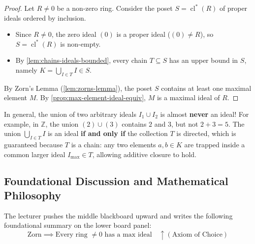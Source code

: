 \begin{content}
\begin{proof}
Let $R \neq 0$ be a non-zero ring. Consider the poset $S = \operatorname{cl}^*(R)$ of proper ideals ordered by inclusion.
\begin{itemize}
    \item Since $R \neq 0$, the zero ideal $(0)$ is a proper ideal ($(0) \neq R$), so $S = \operatorname{cl}^*(R)$ is non-empty.
    \item By \cref{lem:chains-ideals-bounded}, every chain $T \subseteq S$ has an upper bound in $S$, namely $K = \bigcup_{I \in T} I \in S$.
\end{itemize}
By Zorn's Lemma (\cref{lem:zorns-lemma}), the poset $S$ contains at least one maximal element $M$. By \cref{prop:max-element-ideal-equiv}, $M$ is a maximal ideal of $R$.
\end{proof}

\begin{steps}
In general, the union of two arbitrary ideals $I_1 \cup I_2$ is almost \textbf{never} an ideal! For example, in $\mathbb{Z}$, the union $(2) \cup (3)$ contains $2$ and $3$, but not $2 + 3 = 5$.
The union $\bigcup_{I \in T} I$ is an ideal \textbf{if and only if} the collection $T$ is directed, which is guaranteed because $T$ is a chain: any two elements $a, b \in K$ are trapped inside a common larger ideal $I_{\max} \in T$, allowing additive closure to hold.
\end{steps}
\end{content}

\subsection{Foundational Discussion and Mathematical Philosophy}

\begin{note}
The lecturer pushes the middle blackboard upward and writes the following foundational summary on the lower board panel:
\[
\text{Zorn} \implies \text{Every ring } \neq 0 \text{ has a max ideal} \quad \uparrow (\text{Axiom of Choice})
\]
\end{note}

